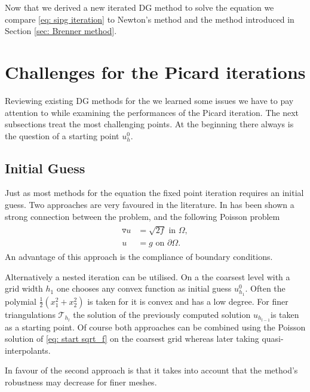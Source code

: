 Now that we derived a new iterated DG method to solve the \MA equation we compare \eqref{eq: sipg iteration} to Newton's method and the method introduced in Section \ref{sec: Brenner method}. 



\section{Challenges for the Picard iterations}
Reviewing existing DG methods for the \MA we learned some issues we have to pay attention to  while examining the performances of the Picard iteration. The next subsections treat the most challenging points.
At the beginning there always is the question of a starting point $u_h^0$.
\subsection{Initial Guess}\label{sec: initial guess}
Just as most methods for the \MA equation the fixed point iteration requires an initial guess. Two approaches are very favoured in the literature.
In \cite[Remark 2.1]{DG2006a} has been shown a strong connection between the \MA problem, and  the following Poisson problem
\begin{align}
	\begin{split}
	\triangledown u &= \sqrt{2f} \text{ in } \Omega, \\ 
	u &= g \text{ on }\partial \Omega.
	\end{split}\label{eq: start sqrt_f}
\end{align}
An advantage of this approach is the compliance of boundary conditions.

Alternatively a nested iteration can be utilised. On a the coarsest level with a grid width $h_1$ one chooses any convex function as initial guess $u^0_{h_1}$. Often the polymial $\frac 1 2 ({x_1^2} + {x_2^2}) $ is taken for it is convex and has a low degree. For finer triangulations $\mathcal{T}_{h_{l}}$ the solution of the previously computed solution $u_{h_{l-1}}$is taken as a starting point. Of course both approaches can be combined using the Poisson solution of \ref{eq: start sqrt_f} on the coarsest grid whereas later taking quasi-interpolants.

In favour of the second approach is that it takes into account that the method's robustness may decrease for finer meshes.

